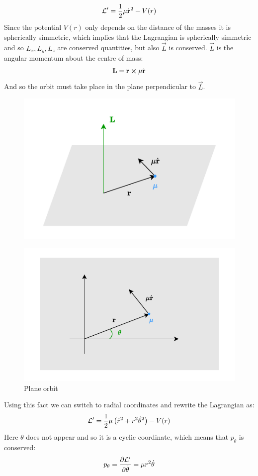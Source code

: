 \begin{equation}
  \mathcal{L} ' = \dfrac{1}{2}\mu\dot{\vb{r}}^2 - V(r)
\end{equation}
Since the potential $V(r)$ only depends on the distance of the masses it is spherically simmetric, which implies that the Lagrangian is spherically simmetric and so $L_x, L_y, L_z$ are conserved quantities, but also $\vec{L}$ is conserved. $\vec{L}$ is the angular momentum about the centre of mass:
\begin{equation}
  \vb{L} = \vb{r}\cross \mu\dot{\vb{r}}
\end{equation}
And so the orbit must take place in the plane perpendicular to $\vec{L}$.
\begin{figure}[H]
  \centering
  \includegraphics[width=0.6\linewidth]{res/svg/two_body_problem_angular.drawio}
\end{figure}
\begin{figure}[H]
  \centering
  \includegraphics[width=0.6\linewidth]{res/svg/two_body_problem_angular_plane.drawio}
  \caption{Plane orbit}
\end{figure}
Using this fact we can switch to radial coordinates and rewrite the Lagrangian as:
\begin{equation}
  \mathcal{L}' = \dfrac{1}{2}\mu\left(\dot{r}^2 + r^2\dot{\theta}^2\right) - V(r)
\end{equation}
Here $\theta$ does not appear and so it is a cyclic coordinate, which means that $p_{\theta}$ is conserved:
\begin{equation}
  p_{\theta} = \pdv{\lagr'}{\dot{\theta}} = \mu r^2 \dot{\theta}
\end{equation}

